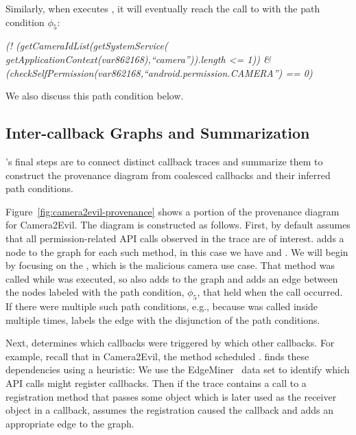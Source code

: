 Similarly, when \hogarth{} executes ,
it will eventually reach the call to  with the path
condition $\phi_5$:
\begin{center}
  \textit{
  (! (getCameraIdList(getSystemService(
  getApplicationContext(var862168),``camera'')).length <= 1)) \&
(checkSelfPermission(var862168,``android.permission.CAMERA'') == 0)
  }
\end{center}
We also discuss this path condition below.

\subsection{Inter-callback Graphs and Summarization}

\hogarth{}'s final steps are to connect distinct callback traces
and summarize them to construct the provenance diagram from
coalesced callbacks and their inferred path conditions.

Figure~\ref{fig:camera2evil-provenance} shows a portion of the
provenance diagram for \textsf{Camera2Evil}. The diagram is constructed as
follows. First, by default \hogarth{} assumes that all
permission-related API calls observed in the trace are of
interest. \hogarth{} adds a node to the graph for each such method,
in this case we have  and .  We will begin 
by focusing on the , which is the malicious camera 
use case.  That method was called while
 was executed, so \hogarth{} also adds
 to the graph and adds an edge between the nodes
labeled with the path condition, $\phi_5$, that held when the
call occurred. If there were multiple such path conditions, e.g.,
because  was called inside 
multiple times, \hogarth{} labels the edge with the disjunction of
the path conditions. 

Next, \hogarth{} determines which callbacks were triggered by which
other callbacks. For example, recall that in \textsf{Camera2Evil}, the
 method scheduled . \hogarth{} finds
these dependencies using a heuristic: We use the
EdgeMiner~\cite{cao:2015:edgeminer} data set to identify which API
calls might register callbacks.  Then if the trace contains a
call to a registration method that passes some object which is later
used as the receiver object in a callback, \hogarth{} assumes the
registration caused the callback and adds an appropriate edge to the
graph.

